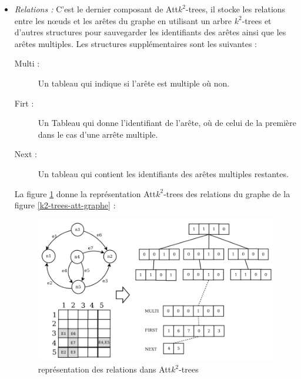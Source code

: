 \begin{itemize}
\item \textit{Relations :} C'est le dernier composant de Att$k^2$-trees, il stocke les relations entre les nœuds et les arêtes du graphe en utilisant un arbre $k^2$-trees et d'autres structures pour sauvegarder les identifiants des arêtes ainsi que les arêtes multiples. Les structures supplémentaires sont les suivantes \citep{alvarez2018compact}:
\begin{description}
\item[Multi :] Un tableau qui indique si l'arête est multiple où non.
\item[Firt :] Un Tableau qui donne l'identifiant de l'arête, où de celui de la première dans le cas d'une arrête multiple.
\item[Next :] Un tableau qui contient les identifiants des arêtes multiples restantes.
\end{description}
La figure \ref{k2-trees-att-relation} donne la représentation Att$k^2$-trees des relations du graphe de la figure \ref{k2-trees-att-graphe} \citep{alvarez2018compact}:
\begin{figure}[H]
\begin{center}
\includegraphics[height=200 pt, width=280 pt]{./ressources/image/k2-trees-att-relation.png} 
\end{center}
\caption{représentation des relations dans Att$k^2$-trees}
\label{k2-trees-att-relation}
\end{figure} 
\end{itemize}

